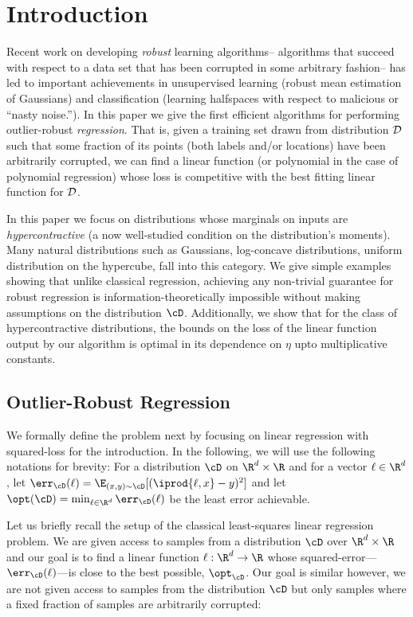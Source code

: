 \section{Introduction}

Recent work on developing {\em robust} learning algorithms--
algorithms that succeed with respect to a data set that has been
corrupted in some arbitrary fashion-- has led to important
achievements in unsupervised learning (robust mean estimation of
Gaussians) and classification (learning halfspaces with respect to
malicious or ``nasty noise.'').  In this paper we give the first
efficient algorithms for performing outlier-robust {\em regression}.  That is,
given a training set drawn from distribution ${\cal D}$ such that some
fraction of its points (both labels and/or locations) have been
arbitrarily corrupted, we can find a linear function (or polynomial in
the case of polynomial regression) whose loss is competitive with the
best fitting linear function for ${\cal D}$.

In this paper we focus on distributions whose marginals on inputs are {\em hypercontractive} (a now well-studied condition on the distribution's moments).  Many natural distributions such as Gaussians, log-concave distributions, uniform distribution on the hypercube, fall into this category.  We give simple examples showing that unlike classical regression, achieving any non-trivial guarantee for robust regression is information-theoretically impossible without making assumptions on the distribution $\cD$. Additionally, we show that for the class of hypercontractive distributions, the bounds on the loss of the linear function output by our algorithm is optimal in its dependence on $\eta$ upto multiplicative constants.

\subsection{Outlier-Robust Regression}
We formally define the problem next by focusing on linear regression with squared-loss for the introduction. In the following, we will use the following notations for brevity: For a distribution $\cD$ on $\R^d \times \R$ and for a vector $\ell \in \R^d$, let $\err_\cD(\ell) = \E_{(x,y) \sim \cD}[ (\iprod{\ell,x} - y)^2]$ and let $\opt(\cD) = \min_{\ell \in \R^d} \err_{\cD}(\ell)$ be the least error achievable. 

Let us briefly recall the setup of the classical least-squares linear regression problem. We are given access to samples from a distribution $\cD$ over $\R^d \times \R$ and our goal is to find a linear function $\ell:\R^d \to \R$ whose squared-error---$\err_{\cD}(\ell)$---is close to the best possible, $\opt_\cD$. Our goal is similar however, we are not given access to samples from the distribution $\cD$ but only samples where a fixed fraction of samples are arbitrarily corrupted:

